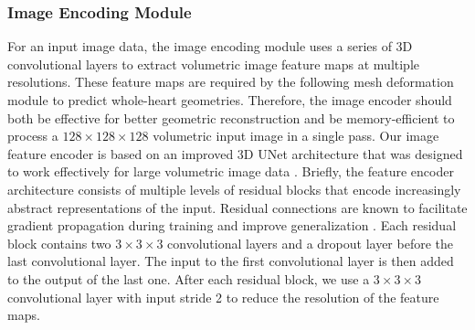 \documentclass[times,review,preprint,authoryear]{elsarticle}
\begin{document}
\subsubsection{Image Encoding Module}
For an input image data, the image encoding module uses a series of 3D convolutional layers to extract volumetric image feature maps at multiple resolutions. These feature maps are required by the following mesh deformation module to predict whole-heart geometries. Therefore, the image encoder should both be effective for better geometric reconstruction and be memory-efficient to process a $128\times128\times128$ volumetric input image in a single pass. Our image feature encoder is based on an improved 3D UNet architecture that was designed to work effectively for large volumetric image data \citep{Isensee2017}. Briefly, the feature encoder architecture consists of multiple levels of residual blocks that encode increasingly abstract representations of the input. Residual connections are known to facilitate gradient propagation during training and improve generalization \citep{He2016}. Each residual block contains two $3\times3\times3$ convolutional layers and a dropout layer before the last convolutional layer. The input to the first convolutional layer is then added to the output of the last one. After each residual block, we use a $3\times3\times3$ convolutional layer with input stride 2 to reduce the resolution of the feature maps. 
\end{document}
